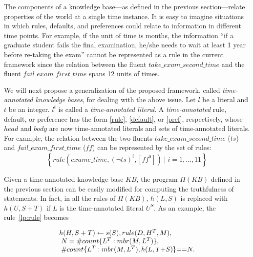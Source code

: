 \documentclass{article}
\begin{document}
The components of a knowledge base---as defined in the previous section---relate properties of the world at a single time instance. It is easy to imagine situations in which rules, defaults, and preferences could relate to information in different time points. For example, if the unit of time is months, the information ``if a graduate student fails the final examination, he/she needs to wait at least 1 year before re-taking the exam'' cannot be represented as a rule in the current framework since the relation between the fluent $take\_exam\_second\_time$ and the fluent $fail\_exam\_first\_time$  spans 12 units of times. 

We will next propose a generalization of the proposed framework, called 
\emph{time-annotated knowledge bases}, for dealing with the above issue. Let $l$ be a literal and $t$ be an integer. $l^t$ is called a \emph{time-annotated literal}. A \emph{time-annotated} rule, default, or preference has the form \eqref{rule}, \eqref{default}, or \eqref{pref}, respectively, whose $head$ and $body$ are now time-annotated literals and sets of time-annotated literals. For example, the relation between the two fluents $take\_exam\_second\_time$ ($ts$) and $fail\_exam\_first\_time$ ($ff$) can be represented by the set of rules: 
$$
\left \{ 
rule(exame\_time, (\neg ts)^i,  [ff^0])  
\mid i=1,\ldots,11 
\right\}
$$
 
Given a time-annotated knowledge base $KB$, the program $\Pi(KB)$ defined in the previous section can be easily modified for computing the truthfulness of statements. In fact, in all the rules of $\Pi(KB)$, $h(L, S)$ is replaced with $h(U, S+T)$ if $L$ is the time-annotated literal $U^S$. As an example, the rule~\eqref{lp:rule} becomes 

  \begin{equation}\label{lp:rule:tt}
\begin{array}{l}
h(H, S+T) \leftarrow  s(S),  
        rule(D, H^T, M),  \\ 
     \hspace{.1cm} N = \# count \{L^T : mbr(M, L^T)\},  \\ 
    \hspace{.1cm}  \# count \{L^T : mbr(M, L^T),  h(L, T{+}S) \} {==} N. 
      \end{array}
\end{equation} 


 
\end{document}
